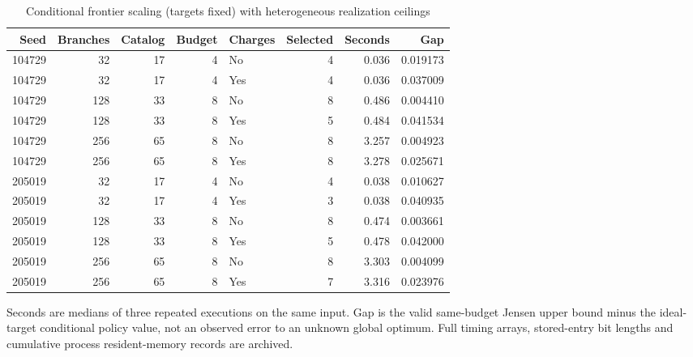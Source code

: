 \begin{table}[p]\centering\small
\caption{Conditional frontier scaling (targets fixed) with heterogeneous realization ceilings}\label{tab:r45-scaling}
\begin{tabular}{rrrrlrrr}\toprule
Seed & Branches & Catalog & Budget & Charges & Selected & Seconds & Gap \\
\midrule
104729 & 32 & 17 & 4 & No & 4 & 0.036 & 0.019173 \\
104729 & 32 & 17 & 4 & Yes & 4 & 0.036 & 0.037009 \\
104729 & 128 & 33 & 8 & No & 8 & 0.486 & 0.004410 \\
104729 & 128 & 33 & 8 & Yes & 5 & 0.484 & 0.041534 \\
104729 & 256 & 65 & 8 & No & 8 & 3.257 & 0.004923 \\
104729 & 256 & 65 & 8 & Yes & 8 & 3.278 & 0.025671 \\
205019 & 32 & 17 & 4 & No & 4 & 0.038 & 0.010627 \\
205019 & 32 & 17 & 4 & Yes & 3 & 0.038 & 0.040935 \\
205019 & 128 & 33 & 8 & No & 8 & 0.474 & 0.003661 \\
205019 & 128 & 33 & 8 & Yes & 5 & 0.478 & 0.042000 \\
205019 & 256 & 65 & 8 & No & 8 & 3.303 & 0.004099 \\
205019 & 256 & 65 & 8 & Yes & 7 & 3.316 & 0.023976 \\
\bottomrule\end{tabular}
\par\smallskip\begin{minipage}{.98\textwidth}\footnotesize Seconds are medians of three repeated executions on the same input. Gap is the valid same-budget Jensen upper bound minus the ideal-target conditional policy value, not an observed error to an unknown global optimum. Full timing arrays, stored-entry bit lengths and cumulative process resident-memory records are archived.\end{minipage}
\end{table}
